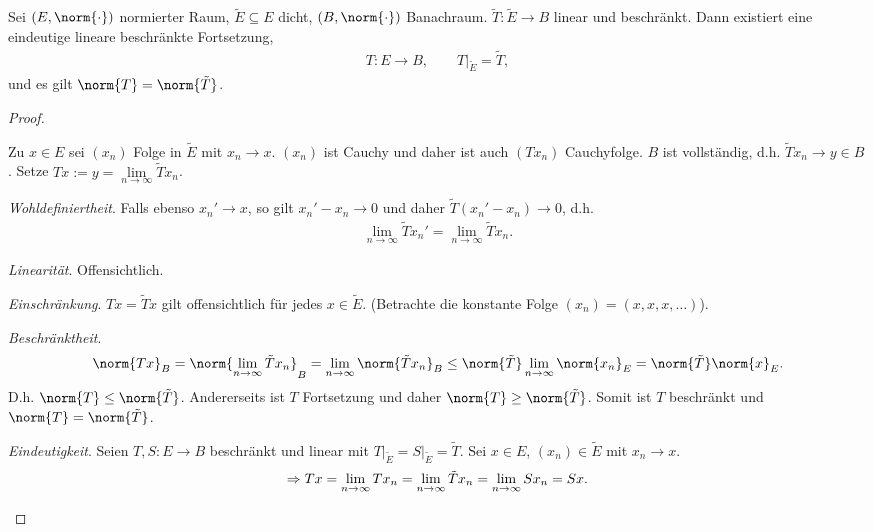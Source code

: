 \begin{prop}[Fortsetzungssatz]
\label{prop:2.5}
Sei $(E,\norm{\cdot})$ normierter Raum, $\tilde{E}\subseteq E$ dicht,
$(B,\norm{\cdot})$ Banachraum. $\tilde{T}: \tilde{E}\to B$ linear und
beschränkt. Dann existiert eine eindeutige lineare beschränkte Fortsetzung,
\begin{align*}
T: E\to B,\qquad T\big|_{\tilde{E}} = \tilde{T},
\end{align*}
und es gilt $\norm{T} = \norm{\tilde{T}}$.\fishhere
\end{prop}
\begin{proof}
\begin{proofenum}
  \item Zu $x\in E$ sei $(x_n)$ Folge in $\tilde{E}$ mit $x_n\to x$. $(x_n)$
  ist Cauchy und daher ist auch $(Tx_n)$ Cauchyfolge. $B$ ist vollständig, d.h.
  $\tilde{T}x_n \to y\in B$. Setze $Tx:= y = \lim\limits_{n\to\infty}
  \tilde{T}x_n$.
  \item \textit{Wohldefiniertheit}. Falls ebenso $x_n'\to x$, so gilt
  $x_n'-x_n\to 0$ und daher $\tilde{T}(x_n'-x_n) \to 0$, d.h.
\begin{align*}
\lim\limits_{n\to\infty} \tilde{T}x_n' = \lim\limits_{n\to\infty} \tilde{T}x_n.
\end{align*}
\item \textit{Linearität}. Offensichtlich.
\item \textit{Einschränkung}. $Tx=\tilde{T}x$ gilt offensichtlich für jedes
$x\in\tilde{E}$. (Betrachte die konstante Folge $(x_n)=(x,x,x,\ldots)$).
\item \textit{Beschränktheit}.
\begin{align*}
\norm{Tx}_B = \norm{\lim\limits_{n\to\infty} \tilde{T}x_n}_B =
\lim\limits_{n\to\infty} \norm{\tilde{T}x_n}_B \le 
\norm{\tilde{T}}\lim\limits_{n\to\infty} \norm{x_n}_E =
\norm{\tilde{T}}\norm{x}_E.
\end{align*}
D.h. $\norm{T}\le \norm{\tilde{T}}$. Andererseits ist $T$ Fortsetzung und daher
$\norm{T}\ge \norm{\tilde{T}}$. Somit ist $T$ beschränkt und
$\norm{T}=\norm{\tilde{T}}$.
\item \textit{Eindeutigkeit}. Seien $T,S: E\to B$ beschränkt und linear mit
$T\big|_{\tilde{E}} = S\big|_{\tilde{E}} = \tilde{T}$. Sei $x\in E$,
$(x_n)\in\tilde{E}$ mit $x_n\to x$.
\begin{align*}
\Rightarrow Tx = \lim\limits_{n\to\infty} Tx_n = \lim\limits_{n\to\infty}
\tilde{T}x_n  = \lim\limits_{n\to\infty} Sx_n = Sx.\qedhere
\end{align*}
\end{proofenum}
\end{proof}

